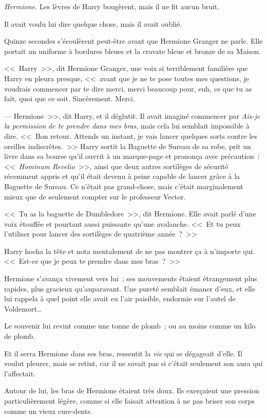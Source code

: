 \emph{Hermione.} Les lèvres de Harry bougèrent, mais il ne fit aucun bruit.

Il avait voulu lui dire quelque chose, mais il avait oublié.

Quinze secondes s'écoulèrent peut-être avant que Hermione Granger ne parle. Elle portait un uniforme à bordures bleues et la cravate bleue et bronze de sa Maison.

<<~Harry~>>, dit Hermione Granger, une voix si terriblement familière que Harry en pleura presque, <<~avant que je ne te pose toutes mes questions, je voudrais commencer par te dire merci, merci beaucoup pour, euh, ce que tu as fait, quoi que ce soit. Sincèrement. Merci.

--- Hermione~>>, dit Harry, et il déglutit. Il avait imaginé commencer par \emph{Ais-je la permission de te prendre dans mes bras}, mais cela lui semblait impossible à dire. <<~Bon retour. Attends un instant, je vais lancer quelques sorts contre les oreilles indiscrètes.~>> Harry sortit la Baguette de Sureau de sa robe, prit un livre dans sa bourse qu'il ouvrit à un marque-page et prononça avec précaution~: <<~\emph{Hominum Revelio}~>>, ainsi que deux autres sortilèges de sécurité récemment appris et qu'il était devenu à peine capable de lancer grâce à la Baguette de Sureau. Ce n'était pas grand-chose, mais c'était marginalement mieux que de seulement compter sur le professeur Vector.

<<~Tu as la baguette de Dumbledore~>>, dit Hermione. Elle avait parlé d'une voix étouffée et pourtant aussi puissante qu'une avalanche. <<~Et tu peux l'utiliser pour lancer des sortilèges de quatrième année~?~>>

Harry hocha la tête et nota mentalement de ne pas montrer ça à n'importe qui. <<~Est-ce que je peux te prendre dans mes bras~?~>>

Hermione s'avança vivement vers lui~; ses mouvements étaient étrangement plus rapides, plus gracieux qu'auparavant. Une pureté semblait émaner d'eux, et elle lui rappela à quel point elle avait eu l'air paisible, endormie sur l'autel de Voldemort…

Le souvenir lui revint comme une tonne de plomb~; ou au moins comme un kilo de plomb.

Et il serra Hermione dans ses bras, ressentit la \emph{vie} qui se dégageait d'elle. Il voulut pleurer, mais se retint, car il ne savait pas si c'était seulement son aura qui l'affectait.

Autour de lui, les bras de Hermione étaient très doux. Ils exerçaient une pression particulièrement légère, comme si elle faisait attention à ne pas briser son corps comme un vieux cure-dents.

